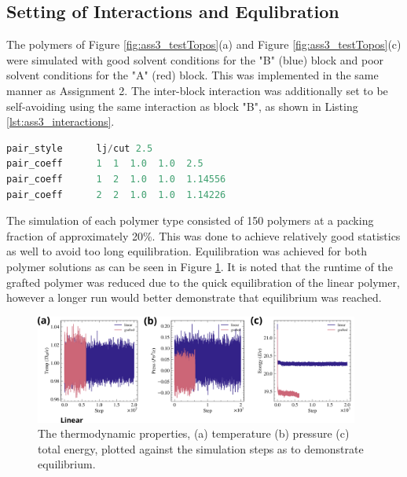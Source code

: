 \documentclass[10pt,a4paper]{labreport}
\begin{document}
\subsection{Setting of Interactions and Equlibration}
The polymers of Figure \ref{fig:ass3_testTopos}(a) and Figure \ref{fig:ass3_testTopos}(c) were simulated with good solvent conditions for the "B" (blue) block and poor solvent conditions for the "A" (red) block. This was implemented in the same manner as Assignment 2. The inter-block interaction was additionally set to be self-avoiding using the same interaction as block "B", as shown in Listing \ref{lst:ass3_interactions}. 
\begin{lstlisting}[language=Python, label=lst:ass3_interactions,
    caption={The interactions between the two blocks of the simulated linear and grafted polymers, Figure \ref{fig:ass3_testTopos}(a) and Figure \ref{fig:ass3_testTopos}(c) respectively.}
    ]
pair_style      lj/cut 2.5
pair_coeff      1  1  1.0  1.0  2.5
pair_coeff      1  2  1.0  1.0  1.14556
pair_coeff      2  2  1.0  1.0  1.14226
\end{lstlisting}

The simulation of each polymer type consisted of 150 polymers at a packing fraction of approximately 20\%. This was done to achieve relatively good statistics as well to avoid too long equilibration. Equilibration was achieved for both polymer solutions as can be seen in Figure \ref{fig:ass3_equilib}. It is noted that the runtime of the grafted polymer was reduced due to the quick equilibration of the linear polymer, however a longer run would better demonstrate that equilibrium was reached. 
\begin{figure}[h]
  \centering  
  \includegraphics[width = 0.95\textwidth]{figs/ass3_equilib.png}
  \caption{The thermodynamic properties, (a) temperature (b) pressure (c) total energy, plotted against the simulation steps as to demonstrate equilibrium.}
  \label{fig:ass3_equilib}
\end{figure}

\newpage
\end{document}
